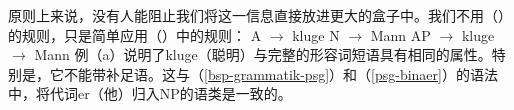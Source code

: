 原则上来说，没有人能阻止我们将这一信息直接放进更大的盒子中。我们不用（）的规则，只是简单应用（）中的规则：
\eal
\ex A $\to$ kluge
\ex N $\to$ Mann
\zl
\eal
\label{Lexikon-Projektion}
\ex AP $\to$ kluge
\ex \nbar $\to$ Mann
\zl
例（a）说明了kluge（聪明）与完整的形容词短语具有相同的属性。特别是，它不能带补足语。这与（\ref{bsp-grammatik-psg}）和（\ref{psg-binaer}）的语法中，将代词er（他）归入NP的语类是一致的。


